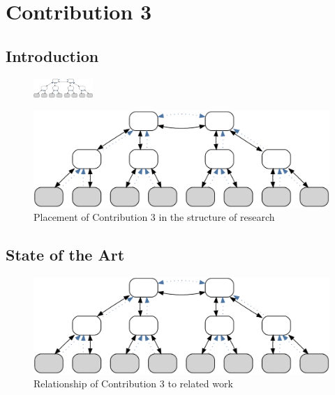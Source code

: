 \cleardoublepage
\chapter{Contribution 3}\label{sec:contrib3}\minitoc\vspace{.5cm}

\section{Introduction}

\begin{figure}
    \centering
    \includegraphics[width=0.2\textwidth]{resources/images/example3}
\end{figure}



\begin{figure}[H]
    \centering
    \includegraphics[width=.55\textwidth]{resources/images/example3}
    \caption{Placement of Contribution 3 in the structure of research}\label{fig:hourglass:contrib3}
\end{figure}

\section{State of the Art}


\begin{figure}[htbp]
    \centering
    \includegraphics[width=.6\textwidth]{resources/images/example3}
    \caption{Relationship of Contribution 3 to related work}\label{fig:contrib3:related}
\end{figure}

